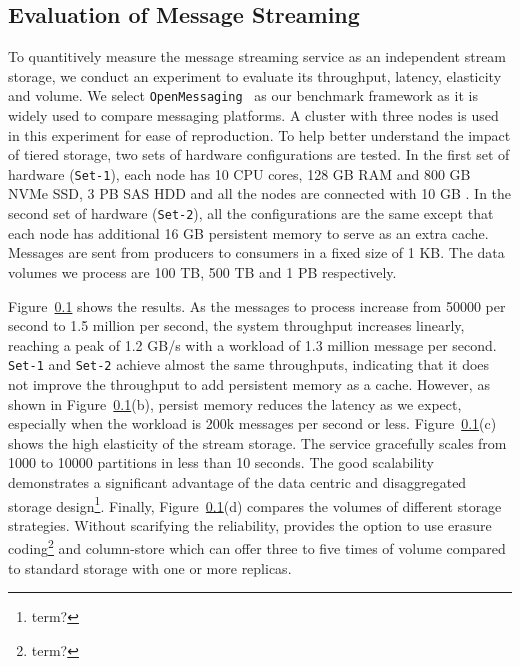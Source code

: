 \subsection{Evaluation of Message Streaming}

To quantitively measure the message streaming service as an independent stream storage, we conduct an experiment to evaluate its throughput, latency, elasticity and volume. We select \texttt{OpenMessaging}~\cite{} as our benchmark framework as it is widely used to compare messaging platforms. A cluster with three nodes is used in this experiment for  ease of reproduction.
 To help better understand the impact of tiered storage, two sets of hardware configurations are tested. In the first set of hardware (\texttt{Set-1}), each node has 10 CPU cores, 128 GB RAM and 800 GB NVMe SSD, 3 PB SAS HDD and all the nodes are connected with 10 GB . In the second set of hardware (\texttt{Set-2}), all the configurations are the same except that each node has additional 16 GB persistent memory to serve as an extra cache. Messages are sent from producers to consumers in a fixed size of 1 KB. The data volumes we process are 100 TB, 500 TB and 1 PB respectively. 


Figure~\ref{} shows the results. As the messages to process increase from 50000 per second to 1.5 million per second, the system throughput increases linearly, reaching a peak of 1.2 GB/s with a workload of 1.3 million message per second. \texttt{Set-1} and \texttt{Set-2} achieve almost the same throughputs, indicating that it does not improve the throughput to add persistent memory as a cache. However, as shown in Figure~\ref{}(b), persist memory reduces the latency as we expect, especially when the workload is 200k messages per second or less. Figure~\ref{}(c) shows the high elasticity of the stream storage. The service gracefully scales from 1000 to 10000 partitions in less than 10 seconds. The good scalability  demonstrates a significant advantage of the data centric and disaggregated storage design\footnote{term?}.  Finally, Figure~\ref{}(d) compares the volumes of different storage strategies. Without scarifying the reliability, \sys provides the option to use erasure coding\footnote{term?} and column-store which can offer three to five times of volume compared to standard storage with one or more replicas. 









